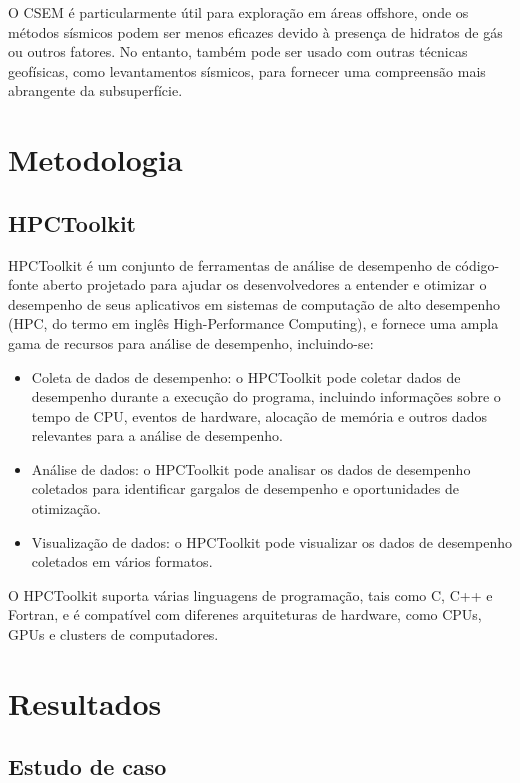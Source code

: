 \documentclass[12pt]{article}
\begin{document}
O CSEM é particularmente útil para exploração em áreas offshore, onde os métodos sísmicos podem ser menos eficazes devido à presença de hidratos de gás ou outros fatores. No entanto, também pode ser usado com outras técnicas geofísicas, como levantamentos sísmicos, para fornecer uma compreensão mais abrangente da subsuperfície.

\section{Metodologia}

\subsection{HPCToolkit}
HPCToolkit é um conjunto de ferramentas de análise de desempenho de código-fonte aberto projetado para ajudar os desenvolvedores a entender e otimizar o desempenho de seus aplicativos em sistemas de computação de alto desempenho (HPC, do termo em inglês High-Performance Computing), e fornece uma ampla gama de recursos para análise de desempenho, incluindo-se:
\begin{itemize}
 \item Coleta de dados de desempenho: o HPCToolkit pode coletar dados de desempenho durante a execução do programa, incluindo informações sobre o tempo de CPU, eventos de hardware, alocação de memória e outros dados relevantes para a análise de desempenho.
  \item Análise de dados: o HPCToolkit pode analisar os dados de desempenho coletados para identificar gargalos de desempenho e oportunidades de otimização.
 \item Visualização de dados: o HPCToolkit pode visualizar os dados de desempenho coletados em vários formatos.
\end{itemize}
O HPCToolkit suporta várias linguagens de programação, tais como C, C++ e Fortran, e é compatível com diferenes arquiteturas de hardware, como CPUs, GPUs e clusters de computadores.

\section{Resultados}

\subsection{Estudo de caso}
\end{document}
